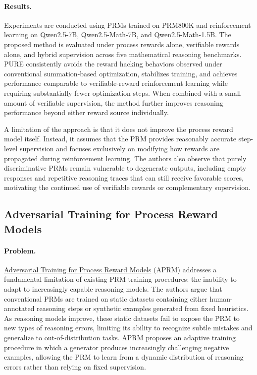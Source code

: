 \documentclass[11pt]{article}
\begin{document}
\paragraph{Results. } Experiments are conducted using PRMs trained on PRM800K and reinforcement learning on Qwen2.5-7B, Qwen2.5-Math-7B, and Qwen2.5-Math-1.5B. The proposed method is evaluated under process rewards alone, verifiable rewards alone, and hybrid supervision across five mathematical reasoning benchmarks. PURE consistently avoids the reward hacking behaviors observed under conventional summation-based optimization, stabilizes training, and achieves performance comparable to verifiable-reward reinforcement learning while requiring substantially fewer optimization steps. When combined with a small amount of verifiable supervision, the method further improves reasoning performance beyond either reward source individually. 

A limitation of the approach is that it does not improve the process reward model itself. Instead, it assumes that the PRM provides reasonably accurate step-level supervision and focuses exclusively on modifying how rewards are propagated during reinforcement learning. The authors also observe that purely discriminative PRMs remain vulnerable to degenerate outputs, including empty responses and repetitive reasoning traces that can still receive favorable scores, motivating the continued use of verifiable rewards or complementary supervision.

\subsection{Adversarial Training for Process Reward Models}

\paragraph{Problem.} \href{https://arxiv.org/abs/2511.22888}{Adversarial Training for Process Reward Models} (APRM) addresses a fundamental limitation of existing PRM training procedures: the inability to adapt to increasingly capable reasoning models. The authors argue that conventional PRMs are trained on static datasets containing either human-annotated reasoning steps or synthetic examples generated from fixed heuristics. As reasoning models improve, these static datasets fail to expose the PRM to new types of reasoning errors, limiting its ability to recognize subtle mistakes and generalize to out-of-distribution tasks. APRM proposes an adaptive training procedure in which a generator produces increasingly challenging negative examples, allowing the PRM to learn from a dynamic distribution of reasoning errors rather than relying on fixed supervision.
\end{document}
